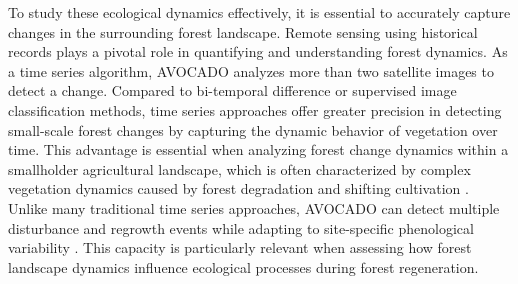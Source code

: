 To study these ecological dynamics effectively, it is essential to accurately capture changes in the surrounding forest landscape. Remote sensing using historical records plays a pivotal role in quantifying and understanding forest dynamics. As a time series algorithm, \ac{AVOCADO} analyzes more than two satellite images to detect a change. Compared to bi-temporal difference or supervised image classification methods, time series approaches offer greater precision in detecting small-scale forest changes by capturing the dynamic behavior of vegetation over time. This advantage is essential when analyzing forest change dynamics within a smallholder agricultural landscape, which is often characterized by complex vegetation dynamics caused by forest degradation and shifting cultivation \citep{jakovacRoleLanduseHistory2021}. Unlike many traditional time series approaches, AVOCADO can detect multiple disturbance and regrowth events while adapting to site-specific phenological variability \citep{decuyperContinuousMonitoringForest2022}. This capacity is particularly relevant when assessing how forest landscape dynamics influence ecological processes during forest regeneration.



